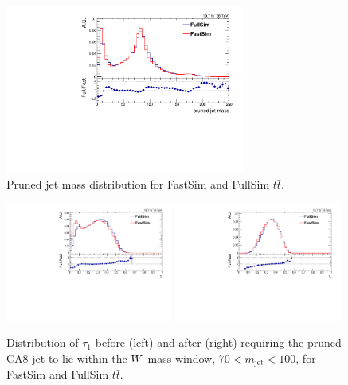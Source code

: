 \begin{figure}[htpb]
\centering
\includegraphics[width=0.7\textwidth]{figures/razor_wtag/FastFull_comparison_TTJets_jmass}
\caption{Pruned jet mass distribution for FastSim and FullSim $t\bar{t}$. 
\label{fig:FastFull_jmass}}
\end{figure}

\begin{figure}[htpb]
\includegraphics[width=0.49\textwidth]{figures/razor_wtag/FastFull_comparison_TTJets_tau1}
\includegraphics[width=0.49\textwidth]{figures/razor_wtag/FastFull_comparison_TTJets_tau1_masscut}
\caption{Distribution of $\tau_1$ before (left) and after (right) requiring the pruned CA8 jet to
lie within the $W$ mass window, $70 < m_{\textrm{jet}} < 100$\GeV, for FastSim and
FullSim $t\bar{t}$.
\label{fig:FastFull_tau1}}
\end{figure}

